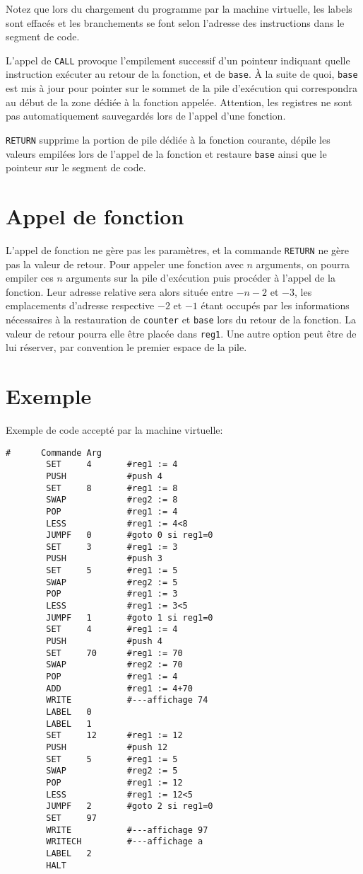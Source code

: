 \documentclass[12pt,a4paper]{article}
\begin{document}
Notez que lors du chargement du programme par la machine virtuelle,
les labels sont effacés et les branchements se font selon l'adresse
des instructions dans le segment de code.

L'appel de {\tt CALL} provoque l'empilement successif d'un pointeur
indiquant quelle instruction exécuter au
retour de la fonction, et de {\tt base}. À la suite de quoi,
{\tt base} est mis à jour pour pointer sur le sommet de la pile
d'exécution
qui correspondra au début de la zone dédiée à la fonction appelée.
Attention, les registres ne sont pas automatiquement sauvegardés lors
de l'appel d'une fonction.

{\tt RETURN} supprime la portion de pile dédiée à la fonction
courante, dépile les valeurs empilées lors de l'appel de la fonction
et restaure {\tt base} ainsi que le pointeur sur le segment de code.

\section{Appel de fonction}
L'appel de fonction ne gère pas les paramètres, et la commande
{\tt RETURN} ne gère pas la valeur de retour.  Pour appeler une
fonction avec $n$ arguments, on pourra empiler ces $n$ arguments sur
la pile d'exécution puis procéder à l'appel de la fonction. Leur
adresse relative sera alors située entre $-n-2$ et $-3$, les
emplacements d'adresse respective $-2$ et $-1$ étant occupés par les
informations nécessaires à la restauration de {\tt counter} et
{\tt base} lors du retour de la fonction.  La valeur de retour pourra
elle être placée dans {\tt reg1}. Une autre option peut être de lui
réserver, par convention le premier espace de la pile.

\section{Exemple}
Exemple de code accepté par la machine virtuelle:
\begin{verbatim}
#      Commande Arg
        SET     4       #reg1 := 4
        PUSH            #push 4
        SET     8       #reg1 := 8
        SWAP            #reg2 := 8
        POP             #reg1 := 4
        LESS            #reg1 := 4<8
        JUMPF   0       #goto 0 si reg1=0
        SET     3       #reg1 := 3
        PUSH            #push 3
        SET     5       #reg1 := 5
        SWAP            #reg2 := 5
        POP             #reg1 := 3
        LESS            #reg1 := 3<5
        JUMPF   1       #goto 1 si reg1=0
        SET     4       #reg1 := 4
        PUSH            #push 4
        SET     70      #reg1 := 70
        SWAP            #reg2 := 70
        POP             #reg1 := 4
        ADD             #reg1 := 4+70
        WRITE           #---affichage 74
        LABEL   0
        LABEL   1
        SET     12      #reg1 := 12
        PUSH            #push 12
        SET     5       #reg1 := 5
        SWAP            #reg2 := 5
        POP             #reg1 := 12 
        LESS            #reg1 := 12<5
        JUMPF   2       #goto 2 si reg1=0
        SET     97
        WRITE           #---affichage 97
        WRITECH         #---affichage a
        LABEL   2
        HALT
\end{verbatim}
\end{document}
